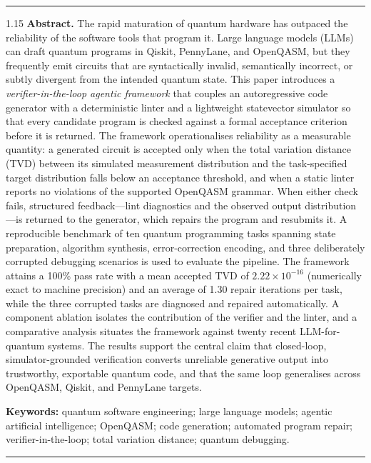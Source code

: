 \documentclass[11pt,a4paper]{article}
\newcounter{algo}
\begin{document}
\noindent\rule{\linewidth}{0.4pt}
\begin{spacing}{1.15}
\noindent\textbf{Abstract.}
The rapid maturation of quantum hardware has outpaced the reliability of the software tools that program it. Large language models (LLMs) can draft quantum programs in Qiskit, PennyLane, and OpenQASM, but they frequently emit circuits that are syntactically invalid, semantically incorrect, or subtly divergent from the intended quantum state. This paper introduces a \emph{verifier-in-the-loop agentic framework} that couples an autoregressive code generator with a deterministic linter and a lightweight statevector simulator so that every candidate program is checked against a formal acceptance criterion before it is returned. The framework operationalises reliability as a measurable quantity: a generated circuit is accepted only when the total variation distance (TVD) between its simulated measurement distribution and the task-specified target distribution falls below an acceptance threshold, and when a static linter reports no violations of the supported OpenQASM grammar. When either check fails, structured feedback---lint diagnostics and the observed output distribution---is returned to the generator, which repairs the program and resubmits it. A reproducible benchmark of ten quantum programming tasks spanning state preparation, algorithm synthesis, error-correction encoding, and three deliberately corrupted debugging scenarios is used to evaluate the pipeline. The framework attains a 100\% pass rate with a mean accepted TVD of $2.22\times10^{-16}$ (numerically exact to machine precision) and an average of 1.30 repair iterations per task, while the three corrupted tasks are diagnosed and repaired automatically. A component ablation isolates the contribution of the verifier and the linter, and a comparative analysis situates the framework against twenty recent LLM-for-quantum systems. The results support the central claim that closed-loop, simulator-grounded verification converts unreliable generative output into trustworthy, exportable quantum code, and that the same loop generalises across OpenQASM, Qiskit, and PennyLane targets.

\vspace{0.6em}
\noindent\textbf{Keywords:} quantum software engineering; large language models; agentic artificial intelligence; OpenQASM; code generation; automated program repair; verifier-in-the-loop; total variation distance; quantum debugging.
\end{spacing}
\noindent\rule{\linewidth}{0.4pt}
\vspace{0.6em}
\end{document}
